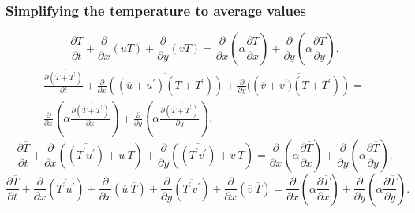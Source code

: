 \documentclass[xcolor=dvipsnames,8pt,aspectratio=34]{beamer}
\begin{document}
		\begin{frame}
		\frametitle{Simplifying the temperature to average values}
		\begin{equation}
		\frac{\partial \overline{T}}{\partial t} + {\frac{\partial{}}{\partial{x}} \overline{(u T)}} + 
		{\frac{\partial{}}{\partial{y}} \overline{(v T)}} 
		=
		{\frac{\partial{}}{\partial{x}}} \left(\alpha {\frac{\partial{\overline{T}}}{\partial{x}}} \right) +
		{\frac{\partial{}}{\partial{y}}} \left(\alpha {\frac{\partial{\overline{T}}}{\partial{y}}} \right) .
		\end{equation}
		\begin{equation}
		\begin{split}
		\frac{\partial \overline{(\overline{T} + T^\prime)}}{\partial t} +{\frac{\partial{}}{\partial{x}} \overline{\left((\overline{u} + u^\prime)  (\overline{T} + T^\prime) \right)}} + 
		{\frac{\partial{}}{\partial{y}} \overline{(\left(\overline{v} + v^\prime)  (\overline{T} + T^\prime) \right)}} 
		= \\
		{\frac{\partial{}}{\partial{x}}} \left(\alpha {\frac{\partial{\overline{(\overline{T} + T^\prime)}}}{\partial{x}}} \right) +
		{\frac{\partial{}}{\partial{y}}} \left(\alpha {\frac{\partial{\overline{(\overline{T} + T^\prime)}}}{\partial{y}}} \right) .
		\end{split}
		\end{equation}
		\begin{equation}
		\frac{\partial \overline{T}}{\partial t} +\frac{\partial{}}{\partial{x}} \left(\overline{\left({T^\prime u^\prime}\right)} + \overline{u} \ \overline{T}\right)     + 
		\frac{\partial{}}{\partial{y}} \left(\overline{\left({T^\prime v^\prime}\right)} + \overline{v} \ \overline{T}\right) 
		=
		{\frac{\partial{}}{\partial{x}}} \left(\alpha {\frac{\partial{\overline{T}}}{\partial{x}}} \right) +
		{\frac{\partial{}}{\partial{y}}} \left(\alpha {\frac{\partial{\overline{T}}}{\partial{y}}} \right) .
		\end{equation}
		\begin{equation}\label{equation_preparede}
		\frac{\partial \overline{T}}{\partial t} +\frac{\partial{}}{\partial{x}} \left(\overline{T^\prime  u^\prime}\right) + \frac{\partial{}}{\partial{x}}\left(\overline{u} \ \overline{T}\right)     + 
		\frac{\partial{}}{\partial{y}} \left(\overline{T^\prime v^\prime}\right) + \frac{\partial{}}{\partial{x}}\left(\overline{v} \ \overline{T}\right) 
		=
		{\frac{\partial{}}{\partial{x}}} \left(\alpha {\frac{\partial{\overline{T}}}{\partial{x}}} \right) +
		{\frac{\partial{}}{\partial{y}}} \left(\alpha {\frac{\partial{\overline{T}}}{\partial{y}}} \right) .
		\end{equation}
		\end{frame}
		
\end{document}
